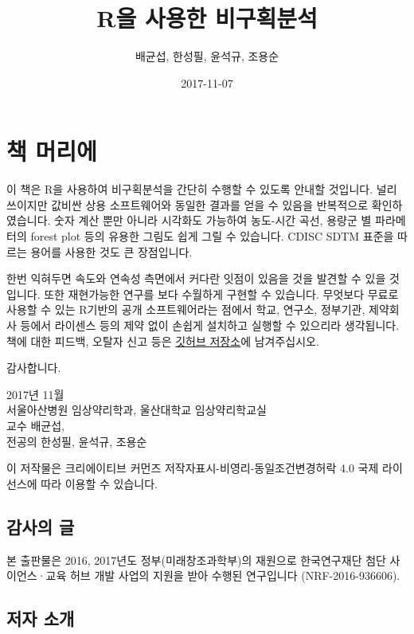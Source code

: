 \documentclass[12pt,]{krantz}
\title{R을 사용한 비구획분석}
\author{배균섭, 한성필, 윤석규, 조용순}
\date{2017-11-07}
\theoremstyle{definition}
\theoremstyle{definition}
\theoremstyle{definition}
\theoremstyle{remark}
\begin{document}
\maketitle

{
\hypersetup{linkcolor=black}
\setcounter{tocdepth}{2}
\tableofcontents
}
\chapter*{책 머리에}\label{-}


\href{https://github.com/asancpt/book-ncar}{}

이 책은 R을 사용하여 비구획분석을 간단히 수행할 수 있도록 안내할
것입니다. 널리 쓰이지만 값비싼 상용 소프트웨어와 동일한 결과를 얻을 수
있음을 반복적으로 확인하였습니다. 숫자 계산 뿐만 아니라 시각화도
가능하여 농도-시간 곡선, 용량군 별 파라메터의 forest plot 등의 유용한
그림도 쉽게 그릴 수 있습니다. CDISC SDTM 표준을 따르는 용어를 사용한
것도 큰 장점입니다.

한번 익혀두면 속도와 연속성 측면에서 커다란 잇점이 있음을 것을 발견할 수
있을 것입니다. 또한 재현가능한 연구를 보다 수월하게 구현할 수 있습니다.
무엇보다 무료로 사용할 수 있는 R기반의 공개 소프트웨어라는 점에서 학교,
연구소, 정부기관, 제약회사 등에서 라이센스 등의 제약 없이 손쉽게
설치하고 실행할 수 있으리라 생각됩니다. 책에 대한 피드백, 오탈자 신고
등은 \href{https://github.com/asancpt/book-ncar/issues}{깃허브 저장소}에
남겨주십시오.

감사합니다.

2017년 11월\\
서울아산병원 임상약리학과, 울산대학교 임상약리학교실\\
교수 배균섭,\\
전공의 한성필, 윤석규, 조용순

이 저작물은 크리에이티브 커먼즈 저작자표시-비영리-동일조건변경허락 4.0
국제 라이선스에 따라 이용할 수 있습니다.

\section*{감사의 글}\label{-}


본 출판물은 2016, 2017년도 정부(미래창조과학부)의 재원으로 한국연구재단
첨단 사이언스·교육 허브 개발 사업의 지원을 받아 수행된 연구입니다
(NRF-2016-936606).

\section*{저자 소개}\label{-}
\end{document}
